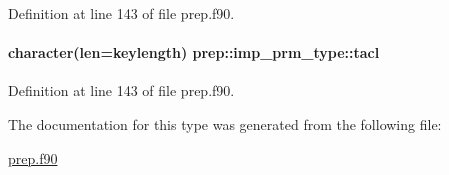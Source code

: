 Definition at line 143 of file prep.\-f90.

\hypertarget{structprep_1_1imp__prm__type_aa245b164026d2518756495bcec97a272}{
\paragraph[{tacl}]{\setlength{\rightskip}{0pt plus 5cm}character(len=keylength) prep\-::imp\-\_\-prm\-\_\-type\-::tacl}}\label{structprep_1_1imp__prm__type_aa245b164026d2518756495bcec97a272}


Definition at line 143 of file prep.\-f90.



The documentation for this type was generated from the following file\-:\begin{DoxyCompactItemize}
\item 
\hyperlink{prep_8f90}{prep.\-f90}\end{DoxyCompactItemize}
